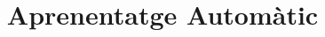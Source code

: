 \documentclass[a4paper]{report}
\title{Aprenentatge Automàtic}
\begin{document}
\maketitle

\tableofcontents
\pagebreak







\end{document}
